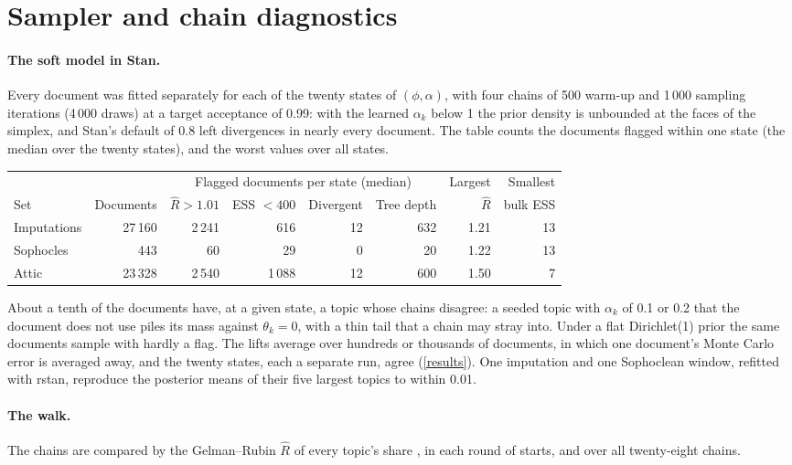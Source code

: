 \documentclass{article}
\theoremstyle{plain}
\theoremstyle{definition}
\theoremstyle{remark}
\begin{document}
\newpage
\section{Sampler and chain diagnostics}\label{diagnostics}

\paragraph{The soft model in Stan.} Every document was fitted separately for each of the twenty states of $(\phi, \alpha)$, with four chains of 500 warm-up and 1\,000 sampling iterations (4\,000 draws) at a target acceptance of 0.99: with the learned $\alpha_k$ below 1 the prior density is unbounded at the faces of the simplex, and Stan's default of 0.8 left divergences in nearly every document. The table counts the documents flagged within one state (the median over the twenty states), and the worst values over all states.

\begin{center}
\begin{tabular}{lrrrrrrr}
\toprule
& & \multicolumn{4}{c}{Flagged documents per state (median)} & Largest & Smallest \\
\cmidrule(lr){3-6}
Set & Documents & $\hat R > 1.01$ & ESS $< 400$ & Divergent & Tree depth & $\hat R$ & bulk ESS \\
\midrule
Imputations & 27\,160 & 2\,241 & 616 & 12 & 632 & 1.21 & 13 \\
Sophocles & 443 & 60 & 29 & 0 & 20 & 1.22 & 13 \\
Attic & 23\,328 & 2\,540 & 1\,088 & 12 & 600 & 1.50 & 7 \\
\bottomrule
\end{tabular}
\end{center}

\noindent About a tenth of the documents have, at a given state, a topic whose chains disagree: a seeded topic with $\alpha_k$ of 0.1 or 0.2 that the document does not use piles its mass against $\theta_k = 0$, with a thin tail that a chain may stray into. Under a flat Dirichlet(1) prior the same documents sample with hardly a flag. The lifts average over hundreds or thousands of documents, in which one document's Monte Carlo error is averaged away, and the twenty states, each a separate run, agree (\autoref{results}). One imputation and one Sophoclean window, refitted with rstan, reproduce the posterior means of their five largest topics to within 0.01.

\paragraph{The walk.} The chains are compared by the Gelman--Rubin $\hat R$ of every topic's share \citep[§11.4]{gelman2013bda3}, in each round of starts, and over all twenty-eight chains.
\end{document}
